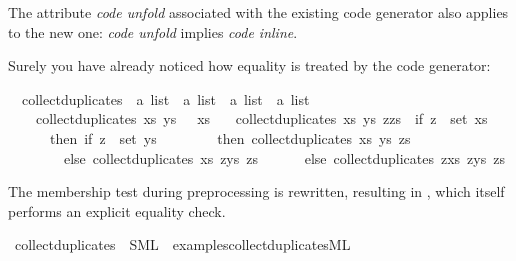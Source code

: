 \begin{isabellebody}
\begin{isamarkuptext}
  \begin{warn}
    The attribute \emph{code unfold}
    associated with the existing code generator also applies to
    the new one: \emph{code unfold} implies \emph{code inline}.
  \end{warn}%
\end{isamarkuptext}%
\isamarkuptrue%
%
\isamarkuptrue%
%
\begin{isamarkuptext}%
Surely you have already noticed how equality is treated
  by the code generator:%
\end{isamarkuptext}%
\isamarkuptrue%
\isamarkupfalse%
\isanewline
\ \ collect{\isacharunderscore}duplicates\ {\isacharcolon}{\isacharcolon}\ {\isachardoublequoteopen}{\isacharprime}a\ list\ {\isasymRightarrow}\ {\isacharprime}a\ list\ {\isasymRightarrow}\ {\isacharprime}a\ list\ {\isasymRightarrow}\ {\isacharprime}a\ list{\isachardoublequoteclose}\ \isanewline
\ \ \ \ {\isachardoublequoteopen}collect{\isacharunderscore}duplicates\ xs\ ys\ {\isacharbrackleft}{\isacharbrackright}\ {\isacharequal}\ xs{\isachardoublequoteclose}\isanewline
\ \ {\isacharbar}\ {\isachardoublequoteopen}collect{\isacharunderscore}duplicates\ xs\ ys\ {\isacharparenleft}z{\isacharhash}zs{\isacharparenright}\ {\isacharequal}\ {\isacharparenleft}if\ z\ {\isasymin}\ set\ xs\isanewline
\ \ \ \ \ \ then\ if\ z\ {\isasymin}\ set\ ys\isanewline
\ \ \ \ \ \ \ \ then\ collect{\isacharunderscore}duplicates\ xs\ ys\ zs\isanewline
\ \ \ \ \ \ \ \ else\ collect{\isacharunderscore}duplicates\ xs\ {\isacharparenleft}z{\isacharhash}ys{\isacharparenright}\ zs\isanewline
\ \ \ \ \ \ else\ collect{\isacharunderscore}duplicates\ {\isacharparenleft}z{\isacharhash}xs{\isacharparenright}\ {\isacharparenleft}z{\isacharhash}ys{\isacharparenright}\ zs{\isacharparenright}{\isachardoublequoteclose}%
\begin{isamarkuptext}%
The membership test during preprocessing is rewritten,
  resulting in , which itself
  performs an explicit equality check.%
\end{isamarkuptext}%
\isamarkuptrue%
\isamarkupfalse%
\ collect{\isacharunderscore}duplicates\ \ SML\ \ {\isachardoublequoteopen}examples{\isacharslash}collect{\isacharunderscore}duplicates{\isachardot}ML{\isachardoublequoteclose}%
\begin{isamarkuptext}%
%
\end{isamarkuptext}%

\end{isabellebody}
